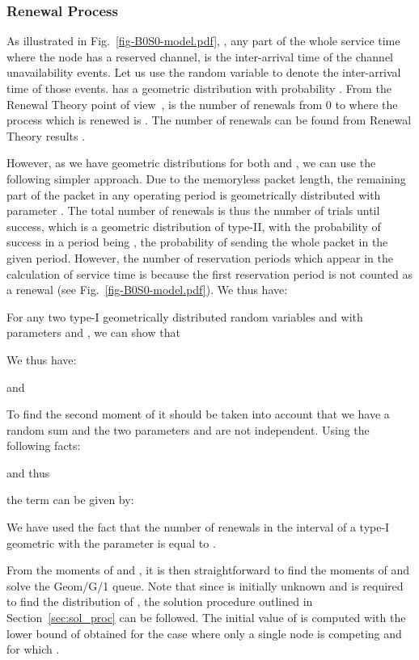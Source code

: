 \documentclass[12pt,journal,oneside,onecolumn]{IEEEtran}
\begin{document}
\subsubsection{Renewal Process}
\label{sec:switching_renewal}

As illustrated in Fig.~\ref{fig-B0S0-model.pdf},
, any part of the whole service time where the node has a reserved
channel, is the inter-arrival time of the channel unavailability 
events.
Let us use the random variable 
 to denote the inter-arrival time of those events.  has 
a geometric distribution with probability .
From the 
Renewal Theory point of view~\cite{cox62},  is the 
number of renewals from 0 to  where the process which is 
renewed is .
The number of renewals can be found from Renewal Theory 
results \cite{cox62}. 

However, as we have  geometric 
distributions for both  and , we can use the following simpler 
approach.
Due to the memoryless packet length, the remaining part of the packet in any operating period is geometrically 
distributed with parameter .  The total number of renewals is 
thus the number of trials until success, which is a geometric distribution of type-II, with the 
probability of success in a period being , the probability of sending the 
whole packet in the given period. However, the number 
of reservation periods which appear in the calculation of service 
time is  because the first reservation period is not counted as a 
renewal (see Fig.~\ref{fig-B0S0-model.pdf}). We thus have:

For any two type-I geometrically distributed random 
variables  and  with parameters  and , we can show that

We thus have:


and


To find the second moment of  it should be taken into account that we have a 
random sum and the two parameters  and  are not independent. Using the 
following facts: 


and thus

the term  can be given by:
\footnotesize

\normalsize
We have used the fact that the number of renewals in the 
interval  of a type-I geometric with the parameter  is equal to .

From the moments of  and , it is then straightforward to find the moments of  and solve the Geom/G/1 queue.
Note that since  is initially unknown and is required to find the distribution of , the solution
procedure outlined in Section~\ref{sec:sol_proc} can be followed. The initial value of  is computed with the lower bound of  obtained for the case where only a
single node is competing and for which .
\end{document}
